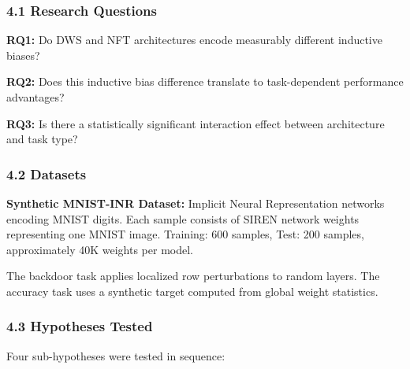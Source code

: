 
\subsubsection{4.1 Research Questions}

\textbf{RQ1:} Do DWS and NFT architectures encode measurably different inductive biases?

\textbf{RQ2:} Does this inductive bias difference translate to task-dependent performance advantages?

\textbf{RQ3:} Is there a statistically significant interaction effect between architecture and task type?

\subsubsection{4.2 Datasets}

\textbf{Synthetic MNIST-INR Dataset:} Implicit Neural Representation networks encoding MNIST digits. Each sample consists of SIREN network weights representing one MNIST image. Training: 600 samples, Test: 200 samples, approximately 40K weights per model.

The backdoor task applies localized row perturbations to random layers. The accuracy task uses a synthetic target computed from global weight statistics.

\subsubsection{4.3 Hypotheses Tested}

Four sub-hypotheses were tested in sequence:

\begin{table}[htbp]
\centering
{}
\end{table}
